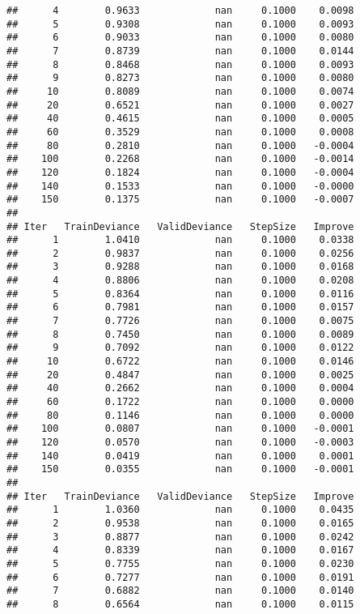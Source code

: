 \documentclass[]{article}
\begin{document}
\begin{verbatim}
##      4        0.9633             nan     0.1000    0.0098
##      5        0.9308             nan     0.1000    0.0093
##      6        0.9033             nan     0.1000    0.0080
##      7        0.8739             nan     0.1000    0.0144
##      8        0.8468             nan     0.1000    0.0093
##      9        0.8273             nan     0.1000    0.0080
##     10        0.8089             nan     0.1000    0.0074
##     20        0.6521             nan     0.1000    0.0027
##     40        0.4615             nan     0.1000    0.0005
##     60        0.3529             nan     0.1000    0.0008
##     80        0.2810             nan     0.1000   -0.0004
##    100        0.2268             nan     0.1000   -0.0014
##    120        0.1824             nan     0.1000   -0.0004
##    140        0.1533             nan     0.1000   -0.0000
##    150        0.1375             nan     0.1000   -0.0007
## 
## Iter   TrainDeviance   ValidDeviance   StepSize   Improve
##      1        1.0410             nan     0.1000    0.0338
##      2        0.9837             nan     0.1000    0.0256
##      3        0.9288             nan     0.1000    0.0168
##      4        0.8806             nan     0.1000    0.0208
##      5        0.8364             nan     0.1000    0.0116
##      6        0.7981             nan     0.1000    0.0157
##      7        0.7726             nan     0.1000    0.0075
##      8        0.7450             nan     0.1000    0.0089
##      9        0.7092             nan     0.1000    0.0122
##     10        0.6722             nan     0.1000    0.0146
##     20        0.4847             nan     0.1000    0.0025
##     40        0.2662             nan     0.1000    0.0004
##     60        0.1722             nan     0.1000    0.0000
##     80        0.1146             nan     0.1000    0.0000
##    100        0.0807             nan     0.1000   -0.0001
##    120        0.0570             nan     0.1000   -0.0003
##    140        0.0419             nan     0.1000    0.0001
##    150        0.0355             nan     0.1000   -0.0001
## 
## Iter   TrainDeviance   ValidDeviance   StepSize   Improve
##      1        1.0360             nan     0.1000    0.0435
##      2        0.9538             nan     0.1000    0.0165
##      3        0.8877             nan     0.1000    0.0242
##      4        0.8339             nan     0.1000    0.0167
##      5        0.7755             nan     0.1000    0.0230
##      6        0.7277             nan     0.1000    0.0191
##      7        0.6882             nan     0.1000    0.0140
##      8        0.6564             nan     0.1000    0.0115

\end{verbatim}
\end{document}
